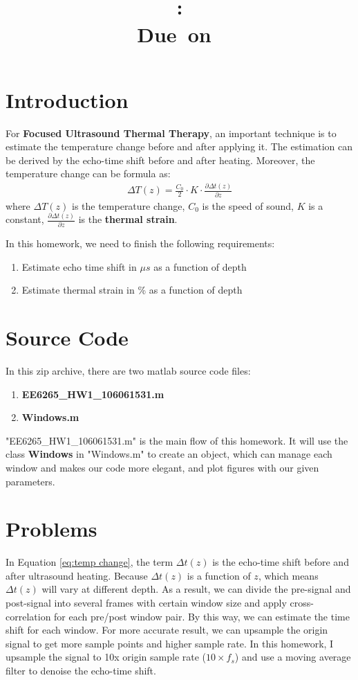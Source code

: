 \documentclass{article}
\title{
    \vspace{2in}
    \textmd{\textbf{\hmwkClass}}\\
    \textmd{\textbf{\hmwkID: \hmwkTitle}} \\
    \normalsize\vspace{0.1in}\small{Due\ on\ \hmwkDueDate}\\
    \vspace{3in}
}
\author{\textbf{\hmwkAuthorName}}
\date{} %
\begin{document}
\maketitle
\newpage

\section{Introduction}
For \textbf{Focused Ultrasound Thermal Therapy}, an important technique is to estimate the temperature change before and after applying it.
The estimation can be derived by the echo-time shift before and after heating. Moreover, the temperature change can be formula as:
\begin{align}
\Delta T(z) = \frac{C_0}{2} \cdot K \cdot \frac{\partial \Delta t(z)}{\partial z}
\label{eq:temp change}
\end{align}
where $\Delta T(z)$ is the temperature change, $C_0$ is the speed of sound, $K$ is a constant, $\frac{\partial \Delta t(z)}{\partial z}$
is the \textbf{thermal strain}.

In this homework, we need to finish the following requirements:
\begin{enumerate}
	\item Estimate echo time shift in $\mu s$ as a function of depth
	\item Estimate thermal strain in \% as a function of depth
\end{enumerate}

\section{Source Code}
In this zip archive, there are two matlab source code files:
\begin{enumerate}
	\item \textbf{EE6265\_HW1\_106061531.m}
	\item \textbf{Windows.m}
\end{enumerate}
"EE6265\_HW1\_106061531.m" is the main flow of this homework. It will use the class \textbf{Windows} in "Windows.m" to create
an object, which can manage each window and makes our code more elegant, and plot figures with our given parameters.

\section{Problems}
In Equation \ref{eq:temp change}, the term $\Delta t(z)$ is the echo-time shift before and after ultrasound heating. Because 
$\Delta t(z)$ is a function of $z$, which means $\Delta t(z)$ will vary at different depth. As a result, we can divide the 
pre-signal and post-signal into several frames with certain window size and apply cross-correlation for each pre/post window
pair. By this way, we can estimate the time shift for each window. For more accurate result, we can upsample the origin signal
to get more sample points and higher sample rate. In this homework, I upsample the signal to 10x origin sample rate
($10 \times f_s$) and use a moving average filter to denoise the echo-time shift.
\end{document}
